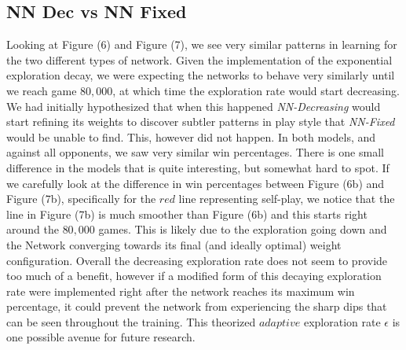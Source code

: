 \documentclass{sig-alternate-05-2015}
\begin{document}
\subsection{NN Dec vs NN Fixed}
	Looking at Figure (6) and Figure (7), we see very similar patterns in learning for the two different types of network. Given the implementation of the exponential exploration decay, we were expecting the networks to behave very similarly until we reach game $80,000$, at which time the exploration rate would start decreasing. We had initially hypothesized that when this happened \emph{NN-Decreasing} would start refining its weights to discover subtler patterns in play style that \emph{NN-Fixed} would be unable to find. This, however did not happen. In both models, and against all opponents, we saw very similar win percentages.
	There is one small difference in the models that is quite interesting, but somewhat hard to spot. If we carefully look at the difference in win percentages between Figure (6b) and Figure (7b), specifically for the $red$ line representing self-play, we notice that the line in Figure (7b) is much smoother than Figure (6b) and this starts right around the $80,000$ games. This is likely due to the exploration going down and the Network converging towards its final (and ideally optimal) weight configuration. Overall the decreasing exploration rate does not seem to provide too much of a benefit, however if a modified form of this decaying exploration rate were implemented right after the network reaches its maximum win percentage, it could prevent the network from experiencing the sharp dips that can be seen throughout the training. This theorized $adaptive$ exploration rate $\epsilon$ is one possible avenue for future research.
\end{document}
